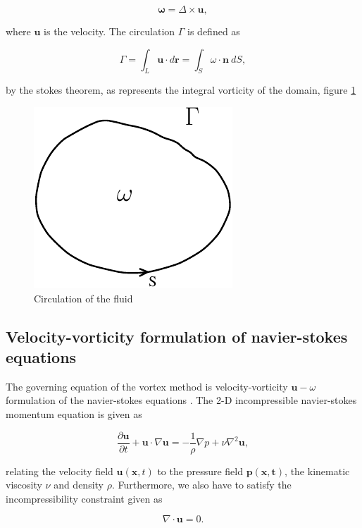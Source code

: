 	\begin{equation}
	\mathbf{\omega} = \Delta \times \mathbf{u},
	\end{equation}

where $\mathbf{u}$ is the velocity. The circulation $\Gamma$ is defined as

	\begin{equation}
	\Gamma = \int_L\mathbf{u}\cdot d \mathbf{r}=\int_S\omega\cdot\mathbf{n}\ dS,
	\end{equation}

by the stokes theorem, as represents the integral vorticity of the domain, figure \ref{fig:vorticityCirculation}

	\begin{figure}[h]
	\centering
	\includegraphics[width=0.3\linewidth]{./figures/lagrangian/vorticityCirculation2-crop.pdf}
	\caption{Circulation of the fluid}
	\label{fig:vorticityCirculation}
	\end{figure}

 
\subsection{Velocity-vorticity formulation of navier-stokes equations}
The governing equation of the vortex method is velocity-vorticity $\mathbf{u}-\omega$ formulation of the navier-stokes equations \cite{Cottet2000a}. The 2-D incompressible navier-stokes momentum equation is given as

	\begin{equation}
	\frac{\partial \mathbf{u}}{\partial t} + \mathbf{u}\cdot\nabla\mathbf{u} = - \frac{1}{\rho} \nabla p + \nu \nabla^2\mathbf{u},
	\label{eq:mom}
	\end{equation}

relating the velocity field $\mathbf{u}\left(\mathbf{x},t\right)$ to the pressure field $\mathbf{p\left(\mathbf{x},t\right)}$, the kinematic viscosity $\nu$ and density $\rho$. Furthermore, we also have to satisfy the incompressibility constraint given as

	\begin{equation}
	\nabla\cdot\mathbf{u} = 0.
	\end{equation}

